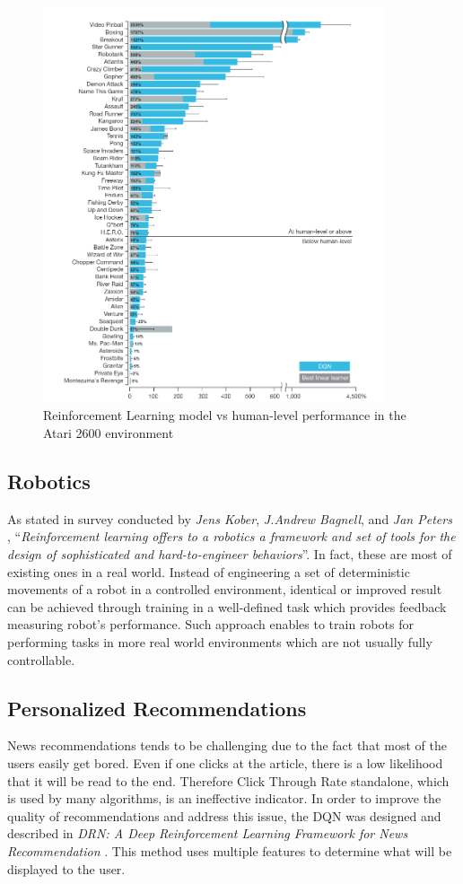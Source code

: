 \begin{figure}[h]
    \includegraphics[width=10cm]{img/Atari2600.png}
    \centering
    \caption{Reinforcement Learning model vs human-level performance in the Atari 2600 environment \cite{DQNAtari}}
    \label{fig:Atari2600}
\end{figure}

\subsection{Robotics}
\label{sub:intro-robotics}
As stated in survey conducted by \emph{Jens Kober}, \emph{J.Andrew Bagnell}, and \emph{Jan Peters} \cite{RNSurvey}, ``\emph{Reinforcement
learning offers to a robotics a framework and set of tools for the design of sophisticated and hard-to-engineer behaviors}''. In fact, these
are most of existing ones in a real world. Instead of engineering a set of deterministic movements of a robot in a controlled environment,
identical or improved result can be achieved through training in a well-defined task which provides feedback measuring robot's performance.
Such approach enables to train robots for performing tasks in more real world environments which are not usually fully controllable.

\subsection{Personalized Recommendations}
\label{sub:intro-personalized-reccomendations}
News recommendations tends to be challenging due to the fact that most of the users easily get bored. Even if one clicks at the article,
there is a low likelihood that it will be read to the end. Therefore Click Through Rate standalone, which is used by many algorithms, is an
ineffective indicator. In order to improve the quality of recommendations and address this issue, the DQN was designed and described in
\emph{DRN: A Deep Reinforcement Learning Framework for News Recommendation} \cite{DRNNewsRecommendaiton}. This method uses multiple features
to determine what will be displayed to the user.
